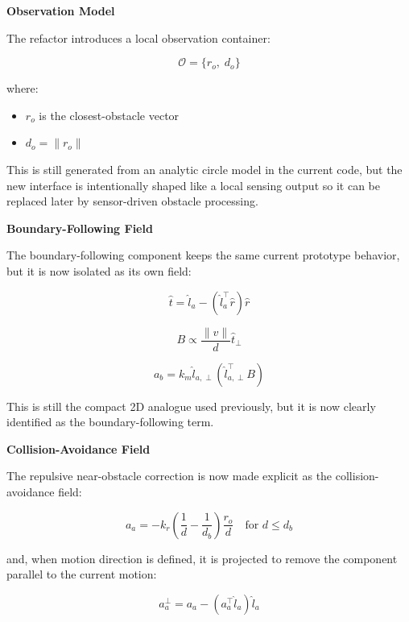 \documentclass[11pt]{article}
\begin{document}
\textbf{Observation Model}

The refactor introduces a local observation container:

\begin{equation}
\mathcal{O} = \{ r_o,\; d_o \}
\end{equation}

where:

\begin{itemize}[leftmargin=*]
  \item $r_o$ is the closest-obstacle vector
  \item $d_o = \lVert r_o \rVert$
\end{itemize}

This is still generated from an analytic circle model in the current code, but
the new interface is intentionally shaped like a local sensing output so it can
be replaced later by sensor-driven obstacle processing.

\textbf{Boundary-Following Field}

The boundary-following component keeps the same current prototype behavior, but
it is now isolated as its own field:

\begin{equation}
\hat{t} = \hat{l}_a - (\hat{l}_a^\top \hat{r})\hat{r}
\end{equation}

\begin{equation}
B \propto \frac{\lVert v \rVert}{d}\hat{t}_{\perp}
\end{equation}

\begin{equation}
a_b = k_m \hat{l}_{a,\perp}(\hat{l}_{a,\perp}^\top B)
\end{equation}

This is still the compact 2D analogue used previously, but it is now clearly
identified as the boundary-following term.

\textbf{Collision-Avoidance Field}

The repulsive near-obstacle correction is now made explicit as the
collision-avoidance field:

\begin{equation}
a_a =
-k_r \left(\frac{1}{d} - \frac{1}{d_b}\right)\frac{r_o}{d}
\quad \text{for } d \le d_b
\end{equation}

and, when motion direction is defined, it is projected to remove the component
parallel to the current motion:

\begin{equation}
a_a^{\perp} = a_a - (a_a^\top \hat{l}_a)\hat{l}_a
\end{equation}
\end{document}
